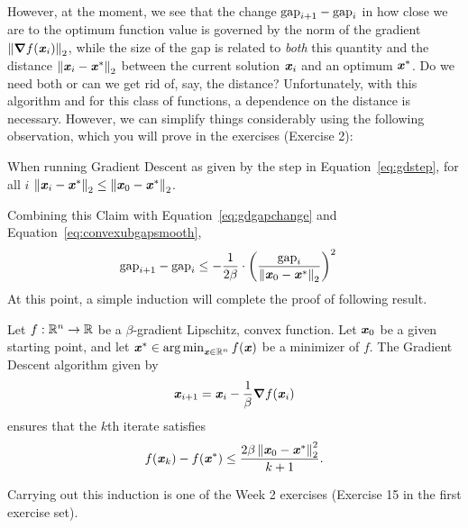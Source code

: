 However, at the moment, we see that the change $\text{gap}_{i+1}- \text{gap}_i$
in how close we are to the optimum function value is governed by the norm of the gradient $\left\| \boldsymbol{\nabla}
  f(\boldsymbol{\mathit{x}}_{i}) \right\|_2$, while the size of the gap is related to \emph{both}
this quantity and the distance $\left\| \boldsymbol{\mathit{x}}_i - \boldsymbol{\mathit{x}}^* \right\|_2$ between the
current solution $\boldsymbol{\mathit{x}}_i$ and an optimum $\boldsymbol{\mathit{x}}^*$.
Do we need both or can we get rid of, say, the distance?
Unfortunately, with this algorithm and for this class of functions, a
dependence on the distance is necessary.
However, we can simplify things considerably using the following
observation, which you will prove in the exercises (Exercise 2):
\begin{claim}
  \label{clm:gdoptdist}
  When running Gradient Descent as given by the step in
  Equation~\eqref{eq:gdstep},  for all $i$
  $\left\| \boldsymbol{\mathit{x}}_i - \boldsymbol{\mathit{x}}^* \right\|_2 \leq \left\| \boldsymbol{\mathit{x}}_0 - \boldsymbol{\mathit{x}}^* \right\|_2$.
\end{claim}
Combining this Claim with Equation~\eqref{eq:gdgapchange} and Equation~\eqref{eq:convexubgapsmooth},
\begin{align}
\label{eq:convexgapsmooth}
  \text{gap}_{i+1}- \text{gap}_i
  &\leq
    -
    \frac{1}{2\beta}
    \cdot
    \left(
    \frac{\text{gap}_i}{\left\| \boldsymbol{\mathit{x}}_0 - \boldsymbol{\mathit{x}}^* \right\|_2 }
    \right)^2
\end{align}
At this point, a simple induction will complete the proof of following result.
\begin{theorem}
  \label{thm:gdsmoothconv}
  Let $f : \mathbb{R}^n \to \mathbb{R}$ be a $\beta$-gradient Lipschitz, convex
  function.
  Let $\boldsymbol{\mathit{x}}_0$ be a given starting point,
  and let $\boldsymbol{\mathit{x}}^* \in \operatorname*{arg\,min}_{\boldsymbol{\mathit{x}} \in \mathbb{R}^n} f(\boldsymbol{\mathit{x}})$ be a minimizer of $f$.
 The Gradient Descent algorithm given by
  \[
   \boldsymbol{\mathit{x}}_{i+1} = \boldsymbol{\mathit{x}}_{i} - \frac{1}{\beta} \boldsymbol{\nabla} f(\boldsymbol{\mathit{x}}_{i})
 \]
 ensures that the $k$th iterate satisfies
 \[
   f(\boldsymbol{\mathit{x}}_{k}) - f(\boldsymbol{\mathit{x}}^*)\leq \frac{2\beta \left\| \boldsymbol{\mathit{x}}_0 - \boldsymbol{\mathit{x}}^* \right\|_2^2}{k+1}
   .
   \]
\end{theorem}
Carrying out this induction is one of the Week 2 exercises (Exercise
15 in the first exercise set).



